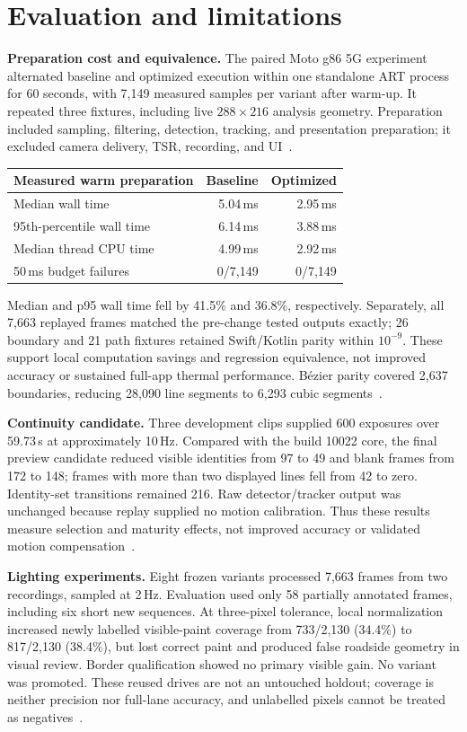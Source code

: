 \documentclass[11pt,a4paper]{article}
\begin{document}
\newpage
\section{Evaluation and limitations}
\textbf{Preparation cost and equivalence.}
The paired Moto g86 5G experiment alternated baseline and optimized execution
within one standalone ART process for 60 seconds, with 7,149 measured samples per
variant after warm-up. It repeated three fixtures, including live $288\times216$
analysis geometry. Preparation included sampling, filtering, detection, tracking,
and presentation preparation; it excluded camera delivery, TSR, recording, and
UI~\cite{prep}.

\begin{center}
\small
\begin{tabular}{@{}lrr@{}}
\toprule
Measured warm preparation & Baseline & Optimized \\
\midrule
Median wall time & 5.04\,ms & 2.95\,ms \\
95th-percentile wall time & 6.14\,ms & 3.88\,ms \\
Median thread CPU time & 4.99\,ms & 2.92\,ms \\
50\,ms budget failures & 0/7,149 & 0/7,149 \\
\bottomrule
\end{tabular}
\end{center}
Median and p95 wall time fell by 41.5\% and 36.8\%, respectively. Separately,
all 7,663 replayed frames matched the pre-change tested outputs exactly;
26 boundary and 21 path fixtures retained Swift/Kotlin parity within $10^{-9}$.
These support local computation savings and regression equivalence, not improved
accuracy or sustained full-app thermal performance. B\'ezier parity covered 2,637
boundaries, reducing 28,090 line segments to 6,293 cubic segments~\cite{bezier}.

\textbf{Continuity candidate.}
Three development clips supplied 600 exposures over 59.73\,s at approximately
10\,Hz. Compared with the build 10022 core, the final preview candidate reduced
visible identities from 97 to 49 and blank frames from 172 to 148; frames with
more than two displayed lines fell from 42 to zero. Identity-set transitions
remained 216. Raw detector/tracker output was unchanged because replay supplied
no motion calibration. Thus these results measure selection and maturity effects,
not improved accuracy or validated motion compensation~\cite{stability}.

\textbf{Lighting experiments.}
Eight frozen variants processed 7,663 frames from two recordings, sampled at
2\,Hz. Evaluation used only 58 partially annotated frames, including six short
new sequences. At three-pixel tolerance, local normalization increased newly
labelled visible-paint coverage from 733/2,130 (34.4\%) to 817/2,130 (38.4\%),
but lost correct paint and produced false roadside geometry in visual review.
Border qualification showed no primary visible gain. No variant was promoted.
These reused drives are not an untouched holdout; coverage is neither precision
nor full-lane accuracy, and unlabelled pixels cannot be treated as negatives~\cite{lighting}.
\end{document}
